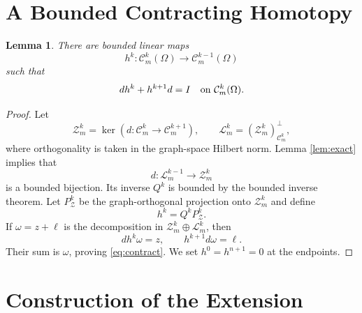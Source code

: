 \documentclass[11pt]{article}
\newtheorem{lemma}{Lemma}
\newcommand{\cC}{\mathcal C}
\newcommand{\cZ}{\mathcal Z}
\newcommand{\cL}{\mathcal L}
\begin{document}
\section*{A Bounded Contracting Homotopy}

\begin{lemma}\label{lem:contraction}
There are bounded linear maps
\[
 h^k:\cC_m^k(\Omega)\longrightarrow\cC_m^{k-1}(\Omega)
\]
such that
\begin{equation}\label{eq:contract}
                     dh^k+h^{k+1}d=I
                     \quad\hbox{on }\cC_m^k(\Omega).
\end{equation}
\end{lemma}

\begin{proof}
Let
\[
 \cZ_m^k=\ker(d:\cC_m^k\to\cC_m^{k+1}),
 \qquad \cL_m^k=(\cZ_m^k)^\perp_{\cC_m^k},
\]
where orthogonality is taken in the graph-space Hilbert norm.  Lemma
\ref{lem:exact} implies that
\[
       d:\cL_m^{k-1}\longrightarrow\cZ_m^k
\]
is a bounded bijection.  Its inverse $Q^k$ is bounded by the bounded inverse
theorem.  Let $P_{\cZ}^k$ be the graph-orthogonal projection onto
$\cZ_m^k$ and define
\[
                         h^k=Q^kP_{\cZ}^k.
\]
If $\omega=z+\ell$ is the decomposition in
$\cZ_m^k\oplus\cL_m^k$, then
\[
                   dh^k\omega=z,
             \qquad h^{k+1}d\omega=\ell.
\]
Their sum is $\omega$, proving \eqref{eq:contract}.  We set
$h^0=h^{n+1}=0$ at the endpoints.
\end{proof}

\section*{Construction of the Extension}
\end{document}
